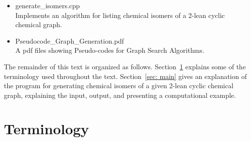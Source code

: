 \documentclass[11pt,titlepage,dvipdfmx,twoside]{article}
\begin{document}
\begin{itemize}
\begin{itemize}
\begin{itemize}
			\item{generate\_isomers.cpp}\\
				Implements an algorithm for listing chemical 
				isomers of
				a 2-lean cyclic chemical graph.
			
			\item{Pseudocode\_Graph\_Generation.pdf}\\
			  A pdf files showing Pseudo-codes for Graph Search Algorithms.
		\end{itemize}

	\end{itemize}
\end{itemize}

The remainder of this text is organized as follows.
Section~\ref{sec:term} explains some of the terminology used throughout the text.
Section~\ref{sec: main}
gives an explanation of the program for generating chemical isomers of
a given 2-lean cyclic chemical graph, explaining the input, output, and
presenting a computational example.



\section{Terminology}
\label{sec:term}
\end{document}
